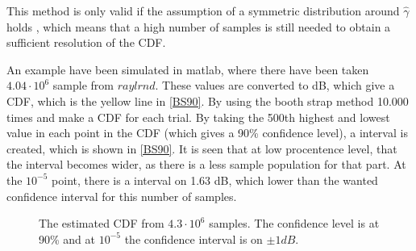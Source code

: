 This method is only valid if the assumption of a symmetric distribution around $\hat{\gamma}$ holds \citep{Bootstrap}, which means that a high number of samples is still needed to obtain a sufficient resolution of the CDF. 

An example have been simulated in matlab, where there have been taken $4.04 \cdot 10^6$ sample from $raylrnd$. These values are converted to dB, which give a CDF, which is the yellow line in \autoref{BS90}. By using the booth strap method 10.000 times and make a CDF for each trial. By taking the 500th highest and lowest value in each point in the CDF (which gives a 90\% confidence level), a interval is created, which is shown in \autoref{BS90}. It is seen that at low procentence level, that the interval becomes wider, as there is a less sample population for that part. At the $10^{-5}$ point, there is a interval on 1.63 dB, which lower than the wanted confidence interval for this number of samples. 

\begin{figure}[H]
\center

\caption{The estimated CDF from $4.3 \cdot 10^6$ samples. The confidence level is at 90\% and at $10^{-5}$ the confidence interval is on $\pm 1dB$.}
\label{BS90}
\end{figure}




